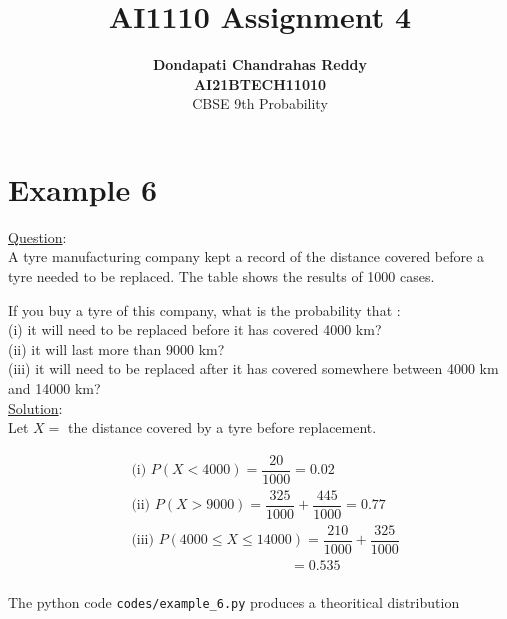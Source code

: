\documentclass[journal,12pt,twocolumn]{IEEEtran}
\begin{document}
\title{\textbf{AI1110 Assignment 4} }
\author{\textbf{Dondapati Chandrahas Reddy}\\\textbf{AI21BTECH11010}\\ CBSE 9th Probability}
\maketitle

{\section{Example 6}}

{\large \underline{Question}:}\\

A tyre manufacturing company kept a record of the distance covered
before a tyre needed to be replaced. The table shows the results of 1000 cases.

\begin{table}[h!]
	
\end{table}

If you buy a tyre of this company, what is the probability that :\\
(i) it will need to be replaced before it has covered 4000 km? \\
(ii) it will last more than 9000 km? \\
(iii) it will need to be replaced after it has covered somewhere between 4000 km and 14000 km? \\

{\large \underline{Solution}:}\\

Let $X=$ the distance covered by a tyre before replacement.

\begin{align}
	&\text{(i) } P(X < 4000) = \dfrac{20}{1000} = 0.02\\[1em]
	&\text{(ii) } P(X > 9000) = \dfrac{325}{1000} + \dfrac{445}{1000} = 0.77\\[1em]
	&\text{(iii) } P(4000 \leq X \leq 14000) = \dfrac{210}{1000} + \dfrac{325}{1000} \\[1ex]
	& \hspace{136pt} = 0.535
\end{align}\\

The python code \texttt{codes/example\_6.py} produces a theoritical distribution
\end{document}
